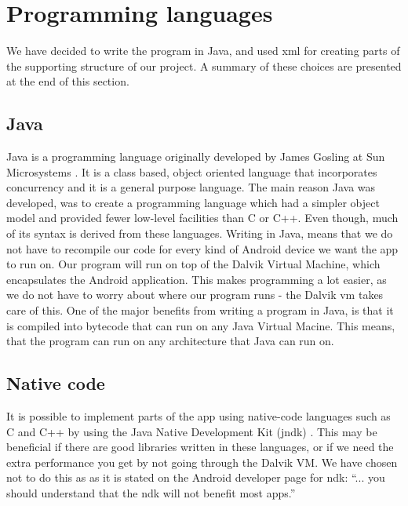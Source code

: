 \newpage

\section{Programming languages}
We have decided to write the program in Java, and used \gls{xml} for creating parts of the supporting structure of our project. A summary of these choices are presented at the end of this section.

\subsection{Java}

Java is a programming language originally developed by James Gosling at Sun Microsystems \cite{bib:java}. It is a class based, object oriented language that incorporates concurrency and it is a general purpose language. The main reason Java was developed, was to create a programming language which had a simpler object model and provided fewer low-level facilities than C or C++. Even though, much of its syntax is derived from these languages.
\newline
\newline
Writing in Java, means that we do not have to recompile our code for every kind of Android device we want the app to run on. Our program will run on top of the Dalvik Virtual Machine, which encapsulates the Android application. This makes programming a lot easier, as we do not have to worry about where our program runs - the Dalvik \gls{vm} takes care of this.
\newline
\newline
One of the major benefits from writing a program in Java, is that it is compiled into bytecode that can run on any Java Virtual Macine. This means, that the program can run on any architecture that Java can run on.

\subsection{Native code}
It is possible to implement parts of the app using native-code languages such as C and C++ by using the Java Native Development Kit (\gls{jndk}) \cite{bib:andk}. This may be beneficial if there are good libraries written in these languages, or if we need the extra performance you get by not going through the Dalvik VM. We have chosen not to do this as as it is stated on the Android developer page for \gls{ndk}: “... you should understand that the \gls{ndk} will not benefit most apps.”

